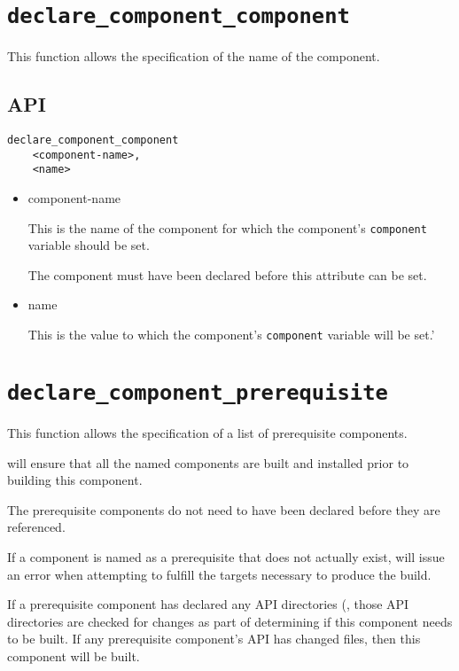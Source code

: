 \section{\texttt{declare\_component\_component}}\label{api:component}

This function allows the specification of the name of the component.

\subsection{API}

\begin{verbatim}
declare_component_component
    <component-name>,
    <name>
\end{verbatim}

\begin{itemize}
\item component-name

  This is the name of the component for which the component's
  \texttt{component} variable should be set.

  The component must have been declared before this attribute can be
  set.

\item name

  This is the value to which the component's \texttt{component}
  variable will be set.'

\end{itemize}

\section{\texttt{declare\_component\_prerequisite}}\label{api:prerequisite}

This function allows the specification of a list of prerequisite
components.

\lmsbw will ensure that all the named components are built and
installed prior to building this component.

The prerequisite components do not need to have been declared before
they are referenced.

If a component is named as a prerequisite that does not actually
exist, \make will issue an error when attempting to fulfill the
targets necessary to produce the build.

If a prerequisite component has declared any API directories
(, those API directories are checked for changes as part
of determining if this component needs to be built.  If any
prerequisite component's API has changed files, then this component
will be built.

